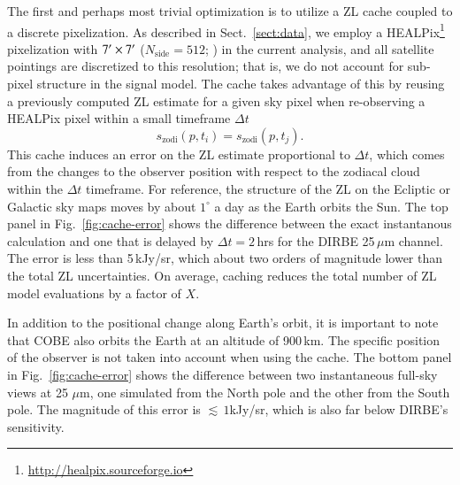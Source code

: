 \documentclass[twocolumn]{aa}
\begin{document}
The first and perhaps most trivial optimization is to utilize a ZL
cache coupled to a discrete pixelization. As described in
Sect.~\ref{sect:data}, we employ a
HEALPix\footnote{\url{http://healpix.sourceforge.io}} pixelization
with $7\arcm\times7\arcm$ ($N_{\mathrm{side}}=512$; \citealp{healpix})
in the current analysis, and all satellite pointings are discretized
to this resolution; that is, we do not account for sub-pixel structure
in the signal model. The cache takes advantage of this by reusing a
previously computed ZL estimate for a given sky pixel when
re-observing a HEALPix pixel within a small timeframe $\Delta t$
\begin{equation}
 s_\mathrm{zodi}(p, t_i) = s_\mathrm{zodi}(p, t_j).
\end{equation}
This cache induces an error on the ZL estimate proportional to $\Delta
t$, which comes from the changes to the observer position with respect
to the zodiacal cloud within the $\Delta t$ timeframe. For reference,
the structure of the ZL on the Ecliptic or Galactic sky maps moves by
about $1^\circ$ a day as the Earth orbits the Sun. The top panel in
Fig.~\ref{fig:cache-error} shows the difference between the exact
instantanous calculation and one that is delayed by $\Delta t =
2\,$hrs for the DIRBE 25\,${\mu}$m channel. The error is less than
5\,kJy/sr, which about two orders of magnitude lower than the
total ZL uncertainties. On average, caching reduces the total number
of ZL model evaluations by a factor of $X$.

In addition to the positional change along Earth's orbit, it is
important to note that COBE also orbits the Earth at an altitude of
900\,km. The specific position of the observer is not taken into
account when using the cache. The bottom panel in
Fig.~\ref{fig:cache-error} shows the difference between two
instantaneous full-sky views at 25 $\mu$m, one simulated from the
North pole and the other from the South pole. The magnitude of this
error is $\lesssim\,1$kJy/sr, which is also far below DIRBE's
sensitivity.
\end{document}
